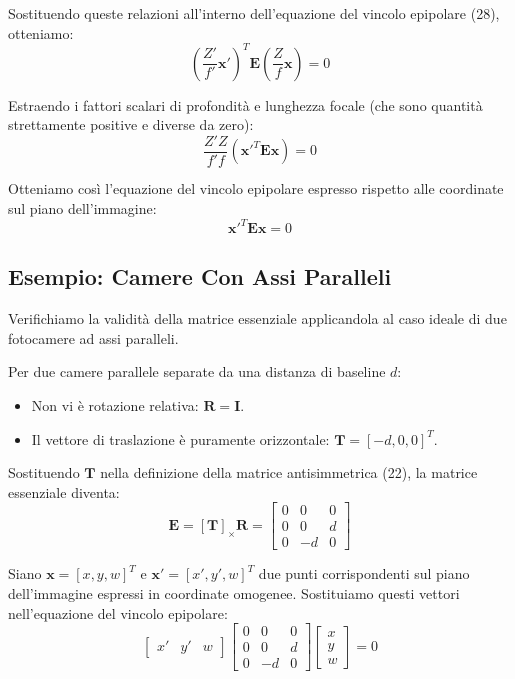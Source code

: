 ﻿\documentclass[11pt, a4paper]{article}
\begin{document}
Sostituendo queste relazioni all'interno dell'equazione del vincolo epipolare (28), otteniamo:
\[
\left( \frac{Z'}{f'} \bm{x}' \right)^T \bm{E} \left( \frac{Z}{f} \bm{x} \right) = 0
\]

Estraendo i fattori scalari di profondità e lunghezza focale (che sono quantità strettamente positive e diverse da zero):
\[
\frac{Z' Z}{f' f} \left( \bm{x}'^T \bm{E} \bm{x} \right) = 0
\]

Otteniamo così l'equazione del vincolo epipolare espresso rispetto alle coordinate sul piano dell'immagine:
\begin{equation}
\boxed{\bm{x}'^T \bm{E} \bm{x} = 0}
\end{equation}



\subsection{Esempio: Camere Con Assi Paralleli}

Verifichiamo la validità della matrice essenziale applicandola al caso ideale di due fotocamere ad assi paralleli.


Per due camere parallele separate da una distanza di baseline $d$:
\begin{itemize}[noitemsep]
    \item Non vi è rotazione relativa: $\bm{R} = \bm{I}$.
    \item Il vettore di traslazione è puramente orizzontale: $\bm{T} = [-d, 0, 0]^T$.
\end{itemize}

Sostituendo $\bm{T}$ nella definizione della matrice antisimmetrica (22), la matrice essenziale diventa:
\begin{equation}
\bm{E} = [\bm{T}]_{\times} \bm{R} = \begin{bmatrix} 0 & 0 & 0 \\ 0 & 0 & d \\ 0 & -d & 0 \end{bmatrix}
\end{equation}

Siano $\bm{x} = [x, y, w]^T$ e $\bm{x}' = [x', y', w]^T$ due punti corrispondenti sul piano dell'immagine espressi in coordinate omogenee. Sostituiamo questi vettori nell'equazione del vincolo epipolare:
\[
\begin{bmatrix} x' & y' & w \end{bmatrix} \begin{bmatrix} 0 & 0 & 0 \\ 0 & 0 & d \\ 0 & -d & 0 \end{bmatrix} \begin{bmatrix} x \\ y \\ w \end{bmatrix} = 0
\]
\end{document}
